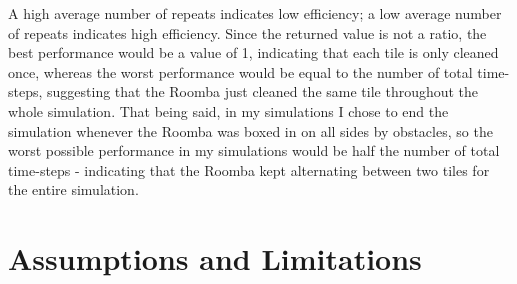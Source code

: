 \documentclass[11pt]{article}
\begin{document}
A high average number of repeats indicates low efficiency; a low average
number of repeats indicates high efficiency. Since the returned value is
not a ratio, the best performance would be a value of 1, indicating that
each tile is only cleaned once, whereas the worst performance would be
equal to the number of total time-steps, suggesting that the Roomba just
cleaned the same tile throughout the whole simulation. That being said,
in my simulations I chose to end the simulation whenever the Roomba was
boxed in on all sides by obstacles, so the worst possible performance in
my simulations would be half the number of total time-steps - indicating
that the Roomba kept alternating between two tiles for the entire
simulation.
\newpage
\section{Assumptions and Limitations}
\end{document}
